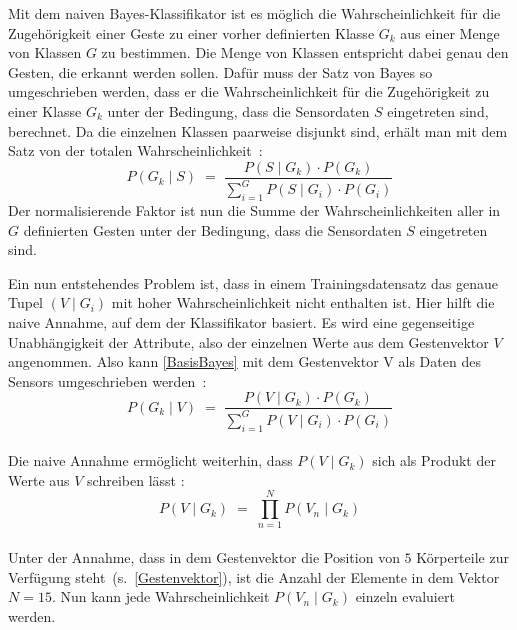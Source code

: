 Mit dem naiven Bayes-Klassifikator ist es möglich die Wahrscheinlichkeit für die Zugehörigkeit einer Geste zu einer vorher definierten Klasse $G_k$ aus einer Menge von Klassen $G$ zu bestimmen. Die Menge von Klassen entspricht dabei genau den Gesten, die erkannt werden sollen. Dafür muss der Satz von Bayes so umgeschrieben werden, dass er die Wahrscheinlichkeit für die Zugehörigkeit zu einer Klasse $G_k$ unter der Bedingung, dass die Sensordaten $S$ eingetreten sind, berechnet. Da die einzelnen Klassen paarweise disjunkt sind, erhält man mit dem Satz von der totalen Wahrscheinlichkeit~\cite{tuckwellWahrscheinlichkeit}:
\begin{equation} \label{BasisBayes}
    P(G_k\mid S) \; = \; \frac{P(S\mid G_k)\cdot P(G_k)}{\sum_{i=1} ^{G} P(S\mid G_i) \cdot P(G_i)}
\end{equation}
Der normalisierende Faktor ist nun die Summe der Wahrscheinlichkeiten aller in $G$ definierten Gesten unter der Bedingung, dass die Sensordaten $S$ eingetreten sind.

Ein nun entstehendes Problem ist, dass in einem Trainingsdatensatz das genaue Tupel $(V\mid G_i)$ mit hoher Wahrscheinlichkeit nicht enthalten ist. Hier hilft die naive Annahme, auf dem der Klassifikator basiert. Es wird eine gegenseitige Unabhängigkeit der Attribute, also der einzelnen Werte aus dem Gestenvektor $V$ angenommen. Also kann \eqref{BasisBayes} mit dem Gestenvektor V als Daten des Sensors umgeschrieben werden~\cite{gillianANBC}:
\begin{equation}
    P(G_k\mid V) \; = \; \frac{P(V\mid G_k)\cdot P(G_k)}{\sum_{i=1} ^{G} P(V\mid G_i) \cdot P(G_i)}
\end{equation} \\
Die naive Annahme ermöglicht weiterhin, dass $P(V\mid G_k)$ sich als Produkt der Werte aus $V$ schreiben lässt \cite{BouNaiveBayes, patternClassification2}:
\begin{equation} \label{naiveBayes1}
    P(V\mid G_k) \; = \; \prod_{n=1} ^{N} P(V_n\mid G_k)
\end{equation} \\
Unter der Annahme, dass in dem Gestenvektor die Position von $5$ Körperteile zur Verfügung steht~(s.~\eqref{Gestenvektor}), ist die Anzahl der Elemente in dem Vektor $N=15$. Nun kann jede Wahrscheinlichkeit $P(V_n\mid G_k)$ einzeln evaluiert werden.~\cite{BouNaiveBayes}


